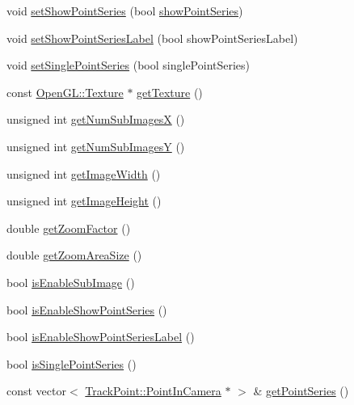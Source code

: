 \begin{DoxyCompactItemize}
\item 
void \mbox{\hyperlink{class_image_open_g_l_widget_a7c6d59c79d8d253d24a184001e965c4e}{set\+Show\+Point\+Series}} (bool \mbox{\hyperlink{class_image_open_g_l_widget_a5be69a20fb48ac0b5e9e6f78a187b488}{show\+Point\+Series}})
\item 
void \mbox{\hyperlink{class_image_open_g_l_widget_a462cbec4f057d369e375b1455d62d3cd}{set\+Show\+Point\+Series\+Label}} (bool show\+Point\+Series\+Label)
\item 
void \mbox{\hyperlink{class_image_open_g_l_widget_a3bca6c1bb92647be48c7edb4e095ea25}{set\+Single\+Point\+Series}} (bool single\+Point\+Series)
\item 
const \mbox{\hyperlink{class_open_g_l_1_1_texture}{Open\+G\+L\+::\+Texture}} $\ast$ \mbox{\hyperlink{class_image_open_g_l_widget_ae48d37d074944ab505eb3d9b3a8a7cb8}{get\+Texture}} ()
\item 
unsigned int \mbox{\hyperlink{class_image_open_g_l_widget_a704677ac5ee71b767a5905ead14fdc1f}{get\+Num\+Sub\+ImagesX}} ()
\item 
unsigned int \mbox{\hyperlink{class_image_open_g_l_widget_a50933016b069d25455cbd0e86862c645}{get\+Num\+Sub\+ImagesY}} ()
\item 
unsigned int \mbox{\hyperlink{class_image_open_g_l_widget_a7ebf129300faf2c55e168089131c9b01}{get\+Image\+Width}} ()
\item 
unsigned int \mbox{\hyperlink{class_image_open_g_l_widget_a5b291ad9fa44ecd670a2447ef54c48b3}{get\+Image\+Height}} ()
\item 
double \mbox{\hyperlink{class_image_open_g_l_widget_ab42b2ef0661e973a89fd611a295ba0f2}{get\+Zoom\+Factor}} ()
\item 
double \mbox{\hyperlink{class_image_open_g_l_widget_a08f939efcfeeee4d0b39562f78a0cd79}{get\+Zoom\+Area\+Size}} ()
\item 
bool \mbox{\hyperlink{class_image_open_g_l_widget_a97e1cefaf5e7a103f869e6ab2bdef80f}{is\+Enable\+Sub\+Image}} ()
\item 
bool \mbox{\hyperlink{class_image_open_g_l_widget_a05ea8cde0274873838b869a85236bcb1}{is\+Enable\+Show\+Point\+Series}} ()
\item 
bool \mbox{\hyperlink{class_image_open_g_l_widget_a71009f85668eac77fb4901c00785d369}{is\+Enable\+Show\+Point\+Series\+Label}} ()
\item 
bool \mbox{\hyperlink{class_image_open_g_l_widget_a5420820b5b94c4362d4031659b3f4268}{is\+Single\+Point\+Series}} ()
\item 
const vector$<$ \mbox{\hyperlink{struct_track_point_1_1_point_in_camera}{Track\+Point\+::\+Point\+In\+Camera}} $\ast$ $>$ \& \mbox{\hyperlink{class_image_open_g_l_widget_aecdc8b3f3d6f614a863ded3c6fae03a8}{get\+Point\+Series}} ()
\end{DoxyCompactItemize}
